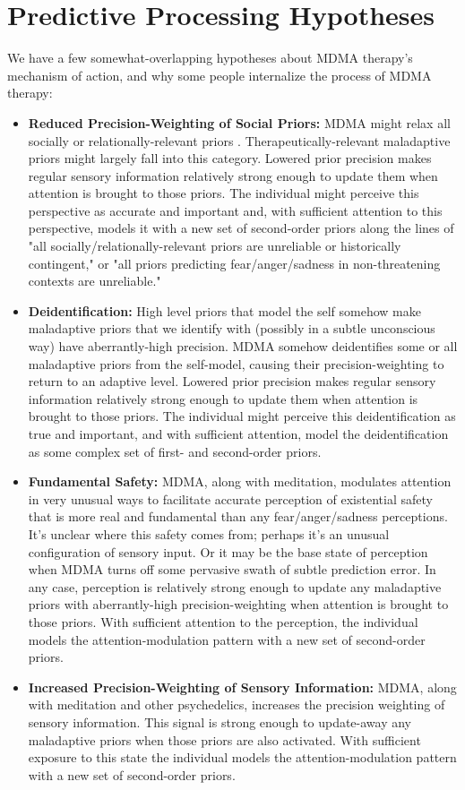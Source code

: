 \documentclass[12pt,letterpaper]{book}
\begin{document}
\chapter{Predictive Processing Hypotheses}
\label{ppHypotheses}
We have a few somewhat-overlapping hypotheses about MDMA therapy's mechanism of action, and why some people internalize the process of MDMA therapy:
\begin{itemize}
    \item \textbf{Reduced Precision-Weighting of Social Priors:} MDMA might relax all socially or relationally-relevant priors \cite{carhart2019rebus}. Therapeutically-relevant maladaptive priors might largely fall into this category. Lowered prior precision makes regular sensory information relatively strong enough to update them when attention is brought to those priors. The individual might perceive this perspective as accurate and important and, with sufficient attention to this perspective, models it with a new set of second-order priors along the lines of "all socially/relationally-relevant priors are unreliable or historically contingent," or "all priors predicting fear/anger/sadness in non-threatening contexts are unreliable."
    \item \textbf{Deidentification:} High level priors that model the self somehow make maladaptive priors that we identify with (possibly in a subtle unconscious way) have aberrantly-high precision. MDMA somehow deidentifies some or all maladaptive priors from the self-model, causing their precision-weighting to return to an adaptive level. Lowered prior precision makes regular sensory information relatively strong enough to update them when attention is brought to those priors. The individual might perceive this deidentification as true and important, and with sufficient attention, model the deidentification as some complex set of first- and second-order priors.
    \item \textbf{Fundamental Safety:} MDMA, along with meditation, modulates attention in very unusual ways to facilitate accurate perception of existential safety that is more real and fundamental than any fear/anger/sadness perceptions. It's unclear where this safety comes from; perhaps it's an unusual configuration of sensory input. Or it may be the base state of perception when MDMA turns off some pervasive swath of subtle prediction error. In any case, perception is relatively strong enough to update any maladaptive priors with aberrantly-high precision-weighting when attention is brought to those priors. With sufficient attention to the perception, the individual models the attention-modulation pattern with a new set of second-order priors.
    \item \textbf{Increased Precision-Weighting of Sensory Information:} MDMA, along with meditation and other psychedelics, increases the precision weighting of sensory information. This signal is strong enough to update-away any maladaptive priors when those priors are also activated. With sufficient exposure to this state the individual models the attention-modulation pattern with a new set of second-order priors.
\end{itemize}
\end{document}
